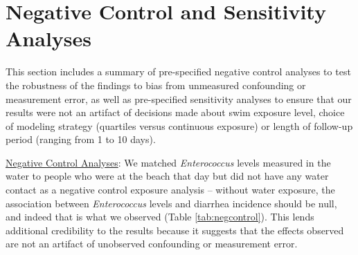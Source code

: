 \documentclass[12pt]{article}\usepackage[]{graphicx}\usepackage[]{color}
\begin{document}
\clearpage
\section{Negative Control and Sensitivity Analyses}

This section includes a summary of pre-specified negative control analyses to test the robustness of the findings to bias from unmeasured confounding or measurement error, as well as pre-specified sensitivity analyses to ensure that our results were not an artifact of decisions made about swim exposure level, choice of modeling strategy (quartiles versus continuous exposure) or length of follow-up period (ranging from 1 to 10 days).

\bigskip
\underline{Negative Control Analyses}: We matched \emph{Enterococcus} levels measured in the water to people who were at the beach that day but did not have any water contact as a negative control exposure analysis\supercite{Lipsitch2010-kq,Arnold2016-yr} -- without water exposure, the association between \emph{Enterococcus} levels and diarrhea incidence should be null, and indeed that is what we observed (Table \ref{tab:negcontrol}). This lends additional credibility to the results because it suggests that the effects observed are not an artifact of unobserved confounding or measurement error.\supercite{Lipsitch2010-kq,Arnold2016-yr}
\end{document}
